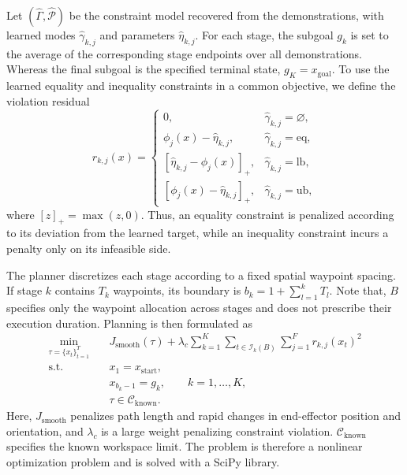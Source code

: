 \documentclass[lettersize,journal]{IEEEtran}
\begin{document}
Let $(\widehat{\Gamma},\widehat{\mathcal{P}})$ be the constraint model recovered from the demonstrations, with learned modes $\widehat{\gamma}_{k,j}$ and parameters $\widehat{\eta}_{k,j}$. For each stage, the subgoal $g_k$ is set to the average of the corresponding stage endpoints over all demonstrations. Whereas the final subgoal is the specified terminal state, $g_K=x_{\mathrm{goal}}$. To use the learned equality and inequality constraints in a common objective, we define the violation residual
\begin{equation}
r_{k,j}(x)=
\begin{cases}
0, & \widehat{\gamma}_{k,j}=\varnothing,\\
\phi_j(x)-\widehat{\eta}_{k,j}, & \widehat{\gamma}_{k,j}=\mathrm{eq},\\
\left[\widehat{\eta}_{k,j}-\phi_j(x)\right]_+, & \widehat{\gamma}_{k,j}=\mathrm{lb},\\
\left[\phi_j(x)-\widehat{\eta}_{k,j}\right]_+, & \widehat{\gamma}_{k,j}=\mathrm{ub},
\end{cases}
\label{eq:barclear_constraint_residual}
\end{equation}
where $[z]_+=\max(z,0)$. Thus, an equality constraint is penalized according to its deviation from the learned target, while an inequality constraint incurs a penalty only on its infeasible side.

The planner discretizes each stage according to a fixed spatial waypoint spacing. If stage $k$ contains $T_k$ waypoints, its boundary is $b_k=1+\sum_{l=1}^{k}T_l$. Note that, $B$ specifies only the waypoint allocation across stages and does not prescribe their execution duration. Planning is then formulated as
\begin{equation}
\begin{aligned}
\min_{\tau=\{x_t\}_{t=1}^{T}}\quad
& J_{\mathrm{smooth}}(\tau)
+\lambda_c\sum_{k=1}^{K}\sum_{t\in\mathcal{I}_k(B)}\sum_{j=1}^{F}r_{k,j}(x_t)^2 \\
\mathrm{s.t.}\quad
& x_1=x_{\mathrm{start}},\\
& x_{b_k-1}=g_k, \qquad k=1,\dots,K,\\
& \tau\in\mathcal{C}_{\mathrm{known}}.
\end{aligned}
\label{eq:barclear_trajectory_optimization}
\end{equation}
Here, $J_{\mathrm{smooth}}$ penalizes path length and rapid changes in end-effector position and orientation, and $\lambda_c$ is a large weight penalizing constraint violation. $\mathcal{C}_{\mathrm{known}}$ specifies the known workspace limit. The problem is therefore a nonlinear optimization problem and is solved with a SciPy library.
\end{document}
